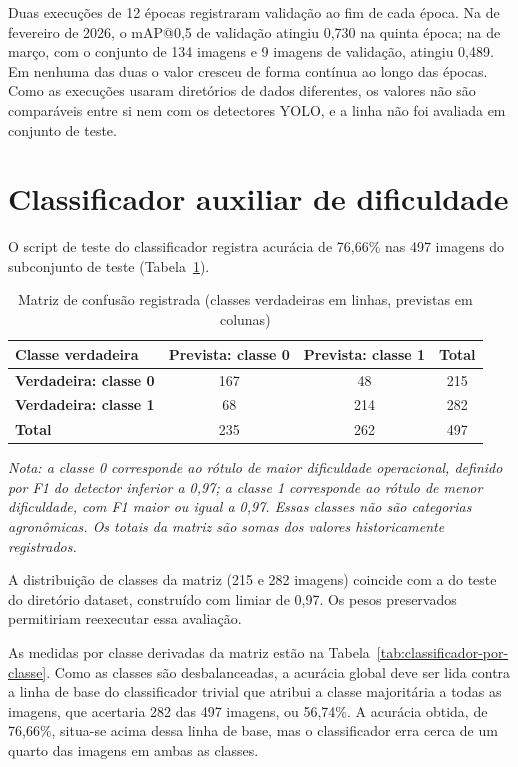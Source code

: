 Duas execu\c{c}\~oes de 12 \'epocas registraram valida\c{c}\~ao ao fim de cada \'epoca. Na de fevereiro de 2026, o mAP@0,5 de valida\c{c}\~ao atingiu 0,730 na quinta \'epoca; na de mar\c{c}o, com o conjunto de 134 imagens e 9 imagens de valida\c{c}\~ao, atingiu 0,489. Em nenhuma das duas o valor cresceu de forma cont\'inua ao longo das \'epocas. Como as execu\c{c}\~oes usaram diret\'orios de dados diferentes, os valores n\~ao s\~ao compar\'aveis entre si nem com os detectores YOLO, e a linha n\~ao foi avaliada em conjunto de teste.

\section{Classificador auxiliar de dificuldade}
\label{sec:resultado-classificador-auxiliar}

O script de teste do classificador registra acur\'acia de 76,66\% nas 497 imagens do subconjunto de teste (Tabela~\ref{tab:matriz-confusao}).

\begin{table}[htb]
\centering
\caption{Matriz de confus\~ao registrada (classes verdadeiras em linhas, previstas em colunas)}
\label{tab:matriz-confusao}
\begin{tabular}{lccc}
\hline
\textbf{Classe verdadeira} & \textbf{Prevista: classe 0} & \textbf{Prevista: classe 1} & \textbf{Total} \\
\hline
\textbf{Verdadeira: classe 0} & 167 & 48 & 215 \\
\textbf{Verdadeira: classe 1} & 68 & 214 & 282 \\
\textbf{Total} & 235 & 262 & 497 \\
\hline
\end{tabular}

\vspace{0.3cm}
\footnotesize \textit{Nota: a classe 0 corresponde ao r\'otulo de maior dificuldade operacional, definido por F1 do detector inferior a 0,97; a classe 1 corresponde ao r\'otulo de menor dificuldade, com F1 maior ou igual a 0,97. Essas classes n\~ao s\~ao categorias agron\^omicas. Os totais da matriz s\~ao somas dos valores historicamente registrados.}
\end{table}

A distribui\c{c}\~ao de classes da matriz (215 e 282 imagens) coincide com a do teste do diret\'orio dataset, constru\'ido com limiar de 0,97. Os pesos preservados permitiriam reexecutar essa avalia\c{c}\~ao.

As medidas por classe derivadas da matriz est\~ao na Tabela~\ref{tab:classificador-por-classe}. Como as classes s\~ao desbalanceadas, a acur\'acia global deve ser lida contra a linha de base do classificador trivial que atribui a classe majorit\'aria a todas as imagens, que acertaria 282 das 497 imagens, ou 56,74\%. A acur\'acia obtida, de 76,66\%, situa-se acima dessa linha de base, mas o classificador erra cerca de um quarto das imagens em ambas as classes.

